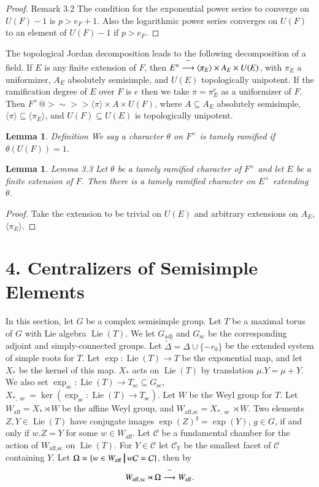 \documentclass[11pt]{amsart}
\theoremstyle{plain}
\newtheorem{lemma}[theorem]{Lemma}
\theoremstyle{definition}
\def\suchthat{\ {\vrule width1truept height.3truecm depth.1truecm}\ }
\def\tild#1{\widetilde#1}
\def\sc{\operatorname{sc}}
\def\Waff{W_{\operatorname{aff}}}
\def\Waffsc{W_{\operatorname{aff,sc}}}
\def\map{\buildrel{}\widetilde{}\over\longrightarrow}
\def\Liet{\operatorname{Lie}(T)}
\def\CurlyC{{\mathcal C}}
\def\IWAHORI{13}
\begin{document}
\begin{proof}{Remark 3.2}  The condition for the exponential power series
to converge on $U(F)-1$ is $p>e_F+1$. Also the
logarithmic power series  converges on $U(F)$ to an element of $U(F)-1$ if $p>e_F$.
\end{proof}

The topological Jordan decomposition leads to the
following decomposition of a field.
If $E$ is any finite extension of $F$, then $E^\times \map \langle\pi_E\rangle
\times A_E\times U(E)$, with $\pi_E$ a uniformizer,
$A_E$ absolutely semisimple, and
$U(E)$ topologically unipotent.
If the ramification degree of $E$ over $F$ is $e$ then
we take $\pi=\pi_E^e$ as a uniformizer of $F$.
Then $F^\times@>\sim>> \langle\pi\rangle\times A\times U(F)$, where 
$A\subseteq A_E$ absolutely semisimple,
$\langle\pi\rangle\subseteq\langle\pi_E\rangle$, and 
$U(F)\subseteq U(E)$ is topologically unipotent.

\begin{lemma}{Definition}  We say a character $\theta$ on $F^\times$
is tamely ramified if $\theta(U(F)) = 1$.
\end{lemma}

\begin{lemma}{Lemma 3.3}  Let $\theta$ be a tamely ramified character
of $F^\times$ and let $E$ be a finite extension of $F$.  Then
there is a tamely ramified character on $E^\times$ extending $\theta$.
\end{lemma}

\begin{proof}  
Take the extension to be trivial on $U(E)$ and arbitrary extensions 
on $A_E$, $\langle\pi_E\rangle$.
\end{proof}

\section{4. Centralizers of Semisimple Elements}

In this section, let $G$ be a complex semisimple group.
Let $T$ be a maximal torus of $G$ with Lie
algebra $\Liet$.  We let $G_{\operatorname{adj}}$ and 
$G_{\sc}$ be the corresponding adjoint and simply-connected groups.
Let $\tild\Delta =\Delta\cup\{-r_0\}$ be the extended system of
simple roots for $T$.  Let $\exp:\Liet\to T$ be the exponential map,
and let $X_*$ be the kernel of this map.  $X_*$ acts on $\Liet$
by translation $\mu.Y=\mu+Y$. We also set 
$\exp_{\sc}:\Liet\to T_{\sc}\subseteq G_{\sc}$,
$X_{*,\sc}=\ker(\exp_{\sc}:\Liet\to T_{\sc})$.  Let $W$ be the 
Weyl group for $T$.  Let $\Waff= X_*\rtimes W$ be the affine Weyl group,
and $\Waffsc = X_{*,\sc}\rtimes W$.
Two elements $Z,Y\in \Liet$ have conjugate images
$\exp(Z)^g = \exp(Y)$, $g\in G$, if and only if
$w.Z=Y$ for some $w\in \Waff$.  Let $\CurlyC$ be a fundamental chamber
for the action of $\Waffsc$ on $\Liet$.  For 
$Y\in \CurlyC$ let $\CurlyC_Y$ be the smallest facet of $\CurlyC$
containing $Y$.  Let $\Omega=\{w\in\Waff
\suchthat w\CurlyC=\CurlyC\}$, then by \cite{\IWAHORI}
$$
\Waffsc\rtimes\Omega
\map
\Waff.
$$
\end{document}
